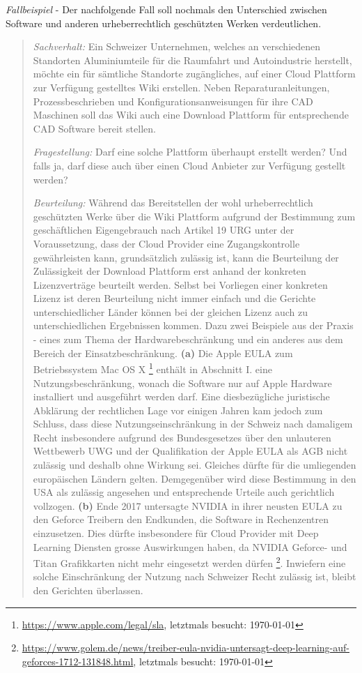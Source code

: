 \documentclass[a4paper,pointlessnumbers]{scrreprt}
\begin{document}
\textit{Fallbeispiel} - Der nachfolgende Fall soll nochmals den Unterschied zwischen Software und anderen urheberrechtlich geschützten Werken verdeutlichen.
\begin{quote}
\textit{Sachverhalt:} Ein Schweizer Unternehmen, welches an verschiedenen Standorten Aluminiumteile für die Raumfahrt und Autoindustrie herstellt, möchte ein für sämtliche Standorte zugängliches, auf einer Cloud Plattform zur Verfügung gestelltes Wiki erstellen. Neben Reparaturanleitungen, Prozessbeschrieben und Konfigurationsanweisungen für ihre CAD Maschinen soll das Wiki auch eine Download Plattform für entsprechende CAD Software bereit stellen. 

\textit{Fragestellung:} Darf eine solche Plattform überhaupt erstellt werden? Und falls ja, darf diese auch über einen Cloud Anbieter zur Verfügung gestellt werden?

\textit{Beurteilung:} Während das Bereitstellen der wohl urheberrechtlich geschützten Werke über die Wiki Plattform aufgrund der Bestimmung zum geschäftlichen Eigengebrauch nach Artikel 19 URG unter der Voraussetzung, dass der Cloud Provider eine Zugangskontrolle gewährleisten kann, grundsätzlich zulässig ist, kann die Beurteilung der Zulässigkeit der Download Plattform erst anhand der konkreten Lizenzverträge beurteilt werden. Selbst bei Vorliegen einer konkreten Lizenz ist deren Beurteilung nicht immer einfach und die Gerichte unterschiedlicher Länder können bei der gleichen Lizenz auch zu unterschiedlichen Ergebnissen kommen. Dazu zwei Beispiele aus der Praxis - eines zum Thema der Hardwarebeschränkung und ein anderes aus dem Bereich der Einsatzbeschränkung. \textbf{(a)} Die Apple EULA zum Betriebssystem Mac OS X \footnote{\href{https://www.apple.com/legal/sla/}{https://www.apple.com/legal/sla}, letztmals besucht: \today} enthält in Abschnitt I. eine Nutzungsbeschränkung, wonach die Software nur auf Apple Hardware installiert und ausgeführt werden darf. Eine diesbezügliche juristische Abklärung der rechtlichen Lage vor einigen Jahren kam jedoch zum Schluss, dass diese Nutzungseinschränkung in der Schweiz nach damaligem Recht insbesondere aufgrund des Bundesgesetzes über den unlauteren Wettbewerb UWG und der Qualifikation der Apple EULA als AGB nicht zulässig und deshalb ohne Wirkung sei. Gleiches dürfte für die umliegenden europäischen Ländern gelten. Demgegenüber wird diese Bestimmung in den USA als zulässig angesehen und entsprechende Urteile auch gerichtlich vollzogen. \textbf{(b)} Ende 2017 untersagte NVIDIA in ihrer neusten EULA zu den Geforce Treibern den Endkunden, die Software in Rechenzentren einzusetzen. Dies dürfte insbesondere für Cloud Provider mit Deep Learning Diensten grosse Auswirkungen haben, da NVIDIA Geforce- und Titan Grafikkarten nicht mehr eingesetzt werden dürfen \footnote{\href{https://www.golem.de/news/treiber-eula-nvidia-untersagt-deep-learning-auf-geforces-1712-131848.html}{https://www.golem.de/news/treiber-eula-nvidia-untersagt-deep-learning-auf-geforces-1712-131848.html}, letztmals besucht: \today}. Inwiefern eine solche Einschränkung der Nutzung nach Schweizer Recht zulässig ist, bleibt den Gerichten überlassen.
\end{quote}
\end{document}
